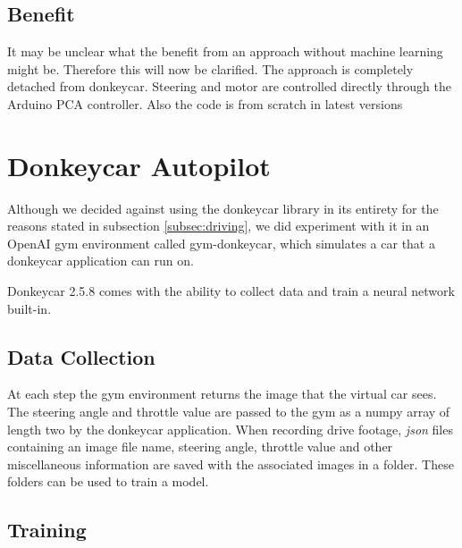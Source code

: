 \documentclass[conference]{IEEEtran}
\begin{document}
\subsection{Benefit}

It may be unclear what the benefit from an approach without machine learning might be.
Therefore this will now be clarified.
The approach is completely detached from donkeycar.
Steering and motor are controlled directly through the Arduino PCA controller.
Also the code is from scratch in latest versions 

\section{Donkeycar Autopilot}

Although we decided against using the donkeycar library in its entirety for the reasons stated in subsection \ref{subsec:driving}, we did experiment with it in an OpenAI gym environment called gym-donkeycar, which simulates a car that a donkeycar application can run on.

Donkeycar 2.5.8 comes with the ability to collect data and train a neural network built-in.

\subsection{Data Collection}

At each step the gym environment returns the image that the virtual car sees. 
The steering angle and throttle value are passed to the gym as a numpy array of length two by the donkeycar application. 
When recording drive footage, \textit{json} files containing an image file name, steering angle, throttle value and other miscellaneous information are saved with the associated images in a folder. 
These folders can be used to train a model.

\subsection{Training}
\end{document}
